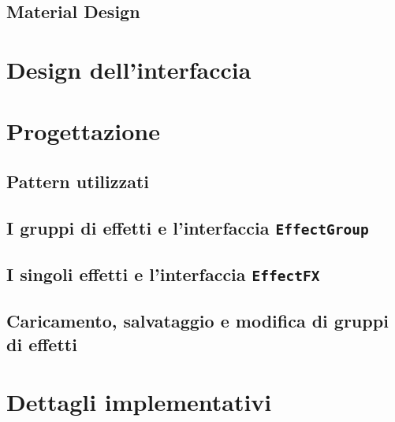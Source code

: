     \subsection{Material Design}\label{sub:material}
  \section{Design dell'interfaccia}\label{sec:design}
  \section{Progettazione}\label{sec:progettazione}
      \subsection{Pattern utilizzati}\label{sub:pattern}
      \subsection{I gruppi di effetti e l'interfaccia \texttt{EffectGroup}}\label{sub:effectGroup}
      \subsection{I singoli effetti e l'interfaccia \texttt{EffectFX}}\label{sub:effectFX}
      \subsection{Caricamento, salvataggio e modifica di gruppi di effetti}\label{sub:serializzazione}
  \section{Dettagli implementativi}\label{sec:dettagli}
